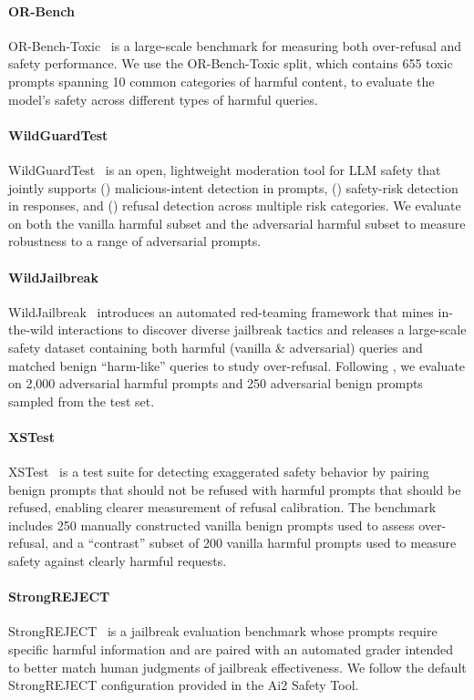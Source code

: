 \documentclass[11pt, letterpaper]{template}
\theoremstyle{plain}
\theoremstyle{definition}
\theoremstyle{remark}
\begin{document}
\paragraph{OR-Bench} OR-Bench-Toxic~\citep{cui2024orbench} is a large-scale benchmark for measuring both over-refusal and safety performance. We use the OR-Bench-Toxic split, which contains 655 toxic prompts spanning 10 common categories of harmful content, to evaluate the model's safety across different types of harmful queries.

\paragraph{WildGuardTest} WildGuardTest~\citep{han2024wildguard} is an open, lightweight moderation tool for LLM safety that jointly supports () malicious-intent detection in prompts, () safety-risk detection in responses, and () refusal detection across multiple risk categories. We evaluate on both the vanilla harmful subset and the adversarial harmful subset to measure robustness to a range of adversarial prompts.

\paragraph{WildJailbreak} WildJailbreak~\citep{jiang2024wildteaming} introduces an automated red-teaming framework that mines in-the-wild interactions to discover diverse jailbreak tactics and releases a large-scale safety dataset containing both harmful (vanilla \& adversarial) queries and matched benign ``harm-like'' queries to study over-refusal. Following \citet{liu2025chasing}, we evaluate on 2{,}000 adversarial harmful prompts and 250 adversarial benign prompts sampled from the test set.

\paragraph{XSTest} 
XSTest~\citep{rottger2023xstest} is a test suite for detecting exaggerated safety behavior by pairing benign prompts that should not be refused with harmful prompts that should be refused, enabling clearer measurement of refusal calibration. The benchmark includes 250 manually constructed vanilla benign prompts used to assess over-refusal, and a ``contrast'' subset of 200 vanilla harmful prompts used to measure safety against clearly harmful requests.

\paragraph{StrongREJECT} StrongREJECT~\citep{souly2024strongreject} is a jailbreak evaluation benchmark whose prompts require specific harmful information and are paired with an automated grader intended to better match human judgments of jailbreak effectiveness. We follow the default StrongREJECT configuration provided in the Ai2 Safety Tool.
\end{document}
